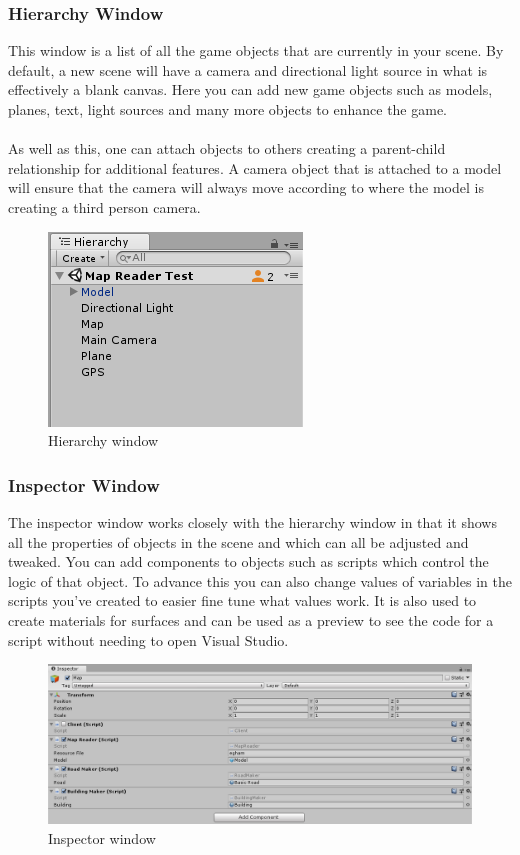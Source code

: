 \documentclass[a4paper]{report}
\begin{document}
\subsubsection{Hierarchy Window}
This window is a list of all the game objects that are currently in your scene. By default, a new scene will have a camera and directional light source in what is effectively a blank canvas. Here you can add new game objects such as models, planes, text, light sources and many more objects to enhance the game. 
\\\\ 
As well as this, one can attach objects to others creating a parent-child relationship for additional features. A camera object that is attached to a model will ensure that the camera will always move according to where the model is creating a third person camera. \cite{Unity}
\begin{figure}[h]
	\centering
	\includegraphics[scale=1]{hierarchy}
	\caption{Hierarchy window}
\end{figure}
\subsubsection{Inspector Window}
The inspector window works closely with the hierarchy window in that it shows all the properties of objects in the scene and which can all be adjusted and tweaked. You can add components to objects such as scripts which control the logic of that object. To advance this you can also change values of variables in the scripts you've created to easier fine tune what values work. It is also used to create materials for surfaces and can be used as a preview to see the code for a script without needing to open Visual Studio. \cite{Unity}
\begin{figure}[h]
	\centering
	\includegraphics[scale=0.55]{inspector}
	\caption{Inspector window}
\end{figure}
\end{document}
